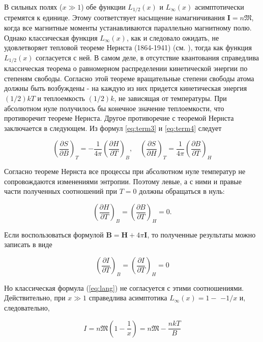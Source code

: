 \documentclass[12pt]{article}
\begin{document}
  В сильных полях ($x \gg 1$) обе функции $L_{1 / 2}(x)$ и $L_{\infty}(x)$ асимптотически стремятся к единице. Этому соответствует насыщение намагничивания $\mathbf{I}=n \mathfrak{M}$, когда все магнитные моменты устанавливаются параллельно магнитному полю. Однако классическая функция $L_{\infty}(x)$, как и следовало ожидать, не удовлетворяет тепловой теореме Нернста (1864-1941) (см. \cite{sivykhin2}), тогда как функция $L_{1 / 2}(x)$ согласуется с ней. В самом деле, в отсутствие квантования справедлива классическая теорема о равномерном распределении кинетической энергии по степеням свободы. Согласно этой теореме вращательные степени свободы атома должны быть возбуждены - на каждую из них придется кинетическая энергия $(1 / 2) k T$ и теплоемкость $(1 / 2) k$, не зависящая от температуры. При абсолютном нуле получилось бы конечное значение теплоемкости, что противоречит теореме Нернста. Другое противоречие с теоремой Нернста заключается в следующем. Из формул \ref{eq:term3} и \ref{eq:term4} следует

  \begin{equation}
  \left(\frac{\partial S}{\partial B}\right)_T=-\frac{1}{4 \pi}\left(\frac{\partial H}{\partial T}\right)_B, \quad\left(\frac{\partial S}{\partial H}\right)_T=\frac{1}{4 \pi}\left(\frac{\partial B}{\partial T}\right)_H
  \end{equation}

  Согласно теореме Нернста все процессы при абсолютном нуле температур не сопровождаются изменениями энтропии. Поэтому левые, а с ними и правые части полученных соотношений при $T=0$ должны обращаться в нуль:

  \begin{equation}
  \left(\frac{\partial H}{\partial T}\right)_B=\left(\frac{\partial B}{\partial T}\right)_H=0 .
  \end{equation}

  Если воспользоваться формулой $\mathbf{B}=\mathbf{H}+4 \pi \mathbf{I}$, то полученные результаты можно записать в виде

  \begin{equation}
  \left(\frac{\partial I}{\partial T}\right)_B=\left(\frac{\partial I}{\partial T}\right)_H=0
  \end{equation}

  Но классическая формула (\ref{eq:lang}) не согласуется с этими соотношениями. Действительно, при $x \gg 1$ справедлива асимптотика $L_{\infty}(x)=1-$ $-1 / x$ и, следовательно,

  \begin{equation}
  I=n \mathfrak{M}\left(1-\frac{1}{x}\right)=n \mathfrak{M}-\frac{n k T}{B}
  \end{equation}
\end{document}
